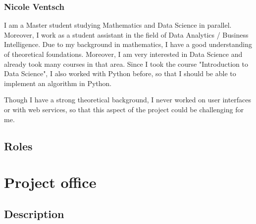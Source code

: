 \documentclass[notitlepage]{article}
\begin{document}
\begin{flushleft}
\subsubsection{Nicole Ventsch}

I am a Master student studying Mathematics and Data Science in parallel.  Moreover, I work as a student assistant in the field of Data Analytics / Business Intelligence. Due to my background in mathematics, I have a good understanding of theoretical foundations. Moreover, I am very interested in Data Science and already took many courses in that area. Since I took the course "Introduction to Data Science", I also worked with Python before, so that I should be able to implement an algorithm in Python.

Though I have a strong theoretical background, I never worked on user interfaces or with web services, so that this aspect of the project could be challenging for me. 

\subsection{Roles}

\section{Project office}

\subsection{Description}

\end{flushleft}
\end{document}
